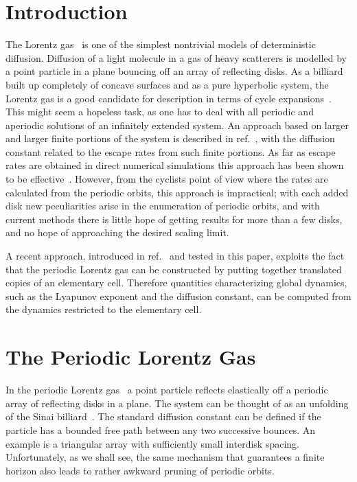 \section{Introduction}
The Lorentz gas~\cite{L} is one of the simplest nontrivial models
of deterministic diffusion.
Diffusion of a light molecule in a gas of heavy scatterers
is modelled
by a point particle in a plane bouncing off an array of reflecting disks.
As a billiard built up completely of
concave surfaces and as a pure hyperbolic system, the
Lorentz gas is a good candidate for description in terms of cycle
expansions~\cite{AAC1}.
This might seem a hopeless task, as one
has to deal with all periodic and aperiodic
solutions of an infinitely extended system. An
approach based on larger and larger finite portions of the system is described
in ref.~\cite{gasPRL}, with the diffusion constant related to
the escape rates from such finite portions.
As far as escape rates are obtained in direct numerical simulations
this approach has been shown to be effective~\cite{gaspbaras}.
However, from the cyclists point of view
where the rates are calculated from the periodic orbits,
this approach is impractical; with each added disk new peculiarities arise
in the enumeration of periodic orbits, and with current
methods there is little hope of getting results for more than a few disks,
and no hope of approaching the desired scaling limit.

A recent approach, introduced in ref.~\cite{CEG} and
tested in this paper, exploits the fact that the periodic Lorentz
gas
can be constructed by putting together
translated copies of an elementary cell.
Therefore quantities characterizing global dynamics, such as
the Lyapunov exponent and the diffusion constant, can be
computed from the dynamics restricted to the elementary cell.

\section{The Periodic Lorentz Gas}
In the periodic Lorentz gas~\cite{L}
a point particle reflects elastically off
a periodic array of reflecting disks in a plane.
The system can
be thought of as an unfolding of the Sinai billiard~\cite{S}.
The standard diffusion constant can be defined if the particle has a bounded
free path between any two successive bounces.
An example is a triangular array with sufficiently small
interdisk spacing.
Unfortunately, as we shall see,
the same mechanism that guarantees a finite horizon
also leads to rather awkward pruning of periodic orbits.


